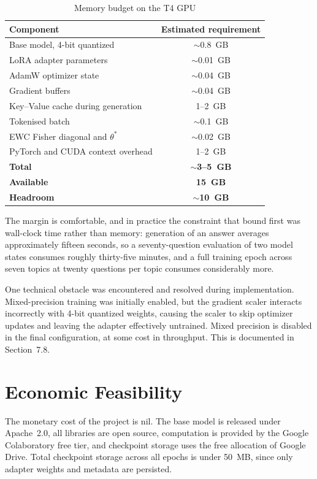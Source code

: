 \documentclass[12pt,a4paper]{report}
\begin{document}
\begin{table}[htbp]
\centering
\caption{Memory budget on the T4 GPU}
\begin{tabular}{>{\raggedright\arraybackslash}p{6cm} c}
\toprule
\textbf{Component} & \textbf{Estimated requirement} \\
\midrule
Base model, 4-bit quantized & $\sim$0.8~GB \\
LoRA adapter parameters & $\sim$0.01~GB \\
AdamW optimizer state & $\sim$0.04~GB \\
Gradient buffers & $\sim$0.04~GB \\
Key--Value cache during generation & 1--2~GB \\
Tokenised batch & $\sim$0.1~GB \\
EWC Fisher diagonal and $\theta^*$ & $\sim$0.02~GB \\
PyTorch and CUDA context overhead & 1--2~GB \\
\midrule
\textbf{Total} & \textbf{$\sim$3--5~GB} \\
\textbf{Available} & \textbf{15~GB} \\
\textbf{Headroom} & \textbf{$\sim$10~GB} \\
\bottomrule
\end{tabular}
\end{table}

The margin is comfortable, and in practice the constraint that bound first was wall-clock time rather than memory: generation of an answer averages approximately fifteen seconds, so a seventy-question evaluation of two model states consumes roughly thirty-five minutes, and a full training epoch across seven topics at twenty questions per topic consumes considerably more.

One technical obstacle was encountered and resolved during implementation. Mixed-precision training was initially enabled, but the gradient scaler interacts incorrectly with 4-bit quantized weights, causing the scaler to skip optimizer updates and leaving the adapter effectively untrained. Mixed precision is disabled in the final configuration, at some cost in throughput. This is documented in Section~7.8.

\section{Economic Feasibility}

The monetary cost of the project is nil. The base model is released under Apache~2.0, all libraries are open source, computation is provided by the Google Colaboratory free tier, and checkpoint storage uses the free allocation of Google Drive. Total checkpoint storage across all epochs is under 50~MB, since only adapter weights and metadata are persisted.
\end{document}
